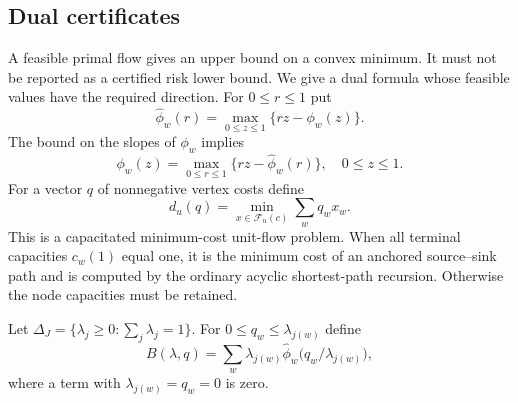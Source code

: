 \subsection{Dual certificates}
A feasible primal flow gives an upper bound on a convex minimum. It
must not be reported as a certified risk lower bound. We give a dual
formula whose feasible values have the required direction.
For $0\le r\le1$ put
\begin{equation}\label{eq:v29-conjugate}
 \widehat\phi_w(r)=\max_{0\le z\le1}\{rz-\phi_w(z)\}.
\end{equation}
The bound on the slopes of $\phi_w$ implies
\begin{equation}\label{eq:v29-support-representation}
 \phi_w(z)=\max_{0\le r\le1}\{rz-\widehat\phi_w(r)\},
                                              \quad 0\le z\le1.
\end{equation}
For a vector $q$ of nonnegative vertex costs define
\[
 d_u(q)=\min_{x\in\mathcal F_u(c)}\sum_w q_wx_w.
\]
This is a capacitated minimum-cost unit-flow problem. When all terminal
capacities $c_w(1)$ equal one, it is the minimum cost of an anchored
source--sink path and is computed by the ordinary acyclic shortest-path
recursion. Otherwise the node capacities must be retained.

Let $\Delta_J=\{\lambda_j\ge0:\sum_j\lambda_j=1\}$. For
$0\le q_w\le\lambda_{j(w)}$ define
\[
 B(\lambda,q)=\sum_w\lambda_{j(w)}
           \widehat\phi_w\bigl(q_w/\lambda_{j(w)}\bigr),
\]
where a term with $\lambda_{j(w)}=q_w=0$ is zero.

